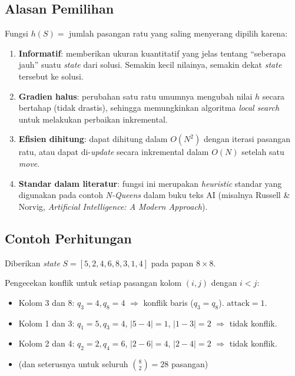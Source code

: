 \documentclass[12pt,a4paper]{article}
\begin{document}
\subsection{Alasan Pemilihan}
\label{subsec:alasan-objective}

Fungsi $h(S) = $ jumlah pasangan ratu yang saling menyerang dipilih karena:
\begin{enumerate}[label=\arabic*.]
    \item \textbf{Informatif}: memberikan ukuran kuantitatif yang jelas tentang ``seberapa jauh'' suatu \textit{state} dari solusi. Semakin kecil nilainya, semakin dekat \textit{state} tersebut ke solusi.
    \item \textbf{Gradien halus}: perubahan satu ratu umumnya mengubah nilai $h$ secara bertahap (tidak drastis), sehingga memungkinkan algoritma \textit{local search} untuk melakukan perbaikan inkremental.
    \item \textbf{Efisien dihitung}: dapat dihitung dalam $O(N^2)$ dengan iterasi pasangan ratu, atau dapat di-\textit{update} secara inkremental dalam $O(N)$ setelah satu \textit{move}.
    \item \textbf{Standar dalam literatur}: fungsi ini merupakan \textit{heuristic} standar yang digunakan pada contoh \textit{N-Queens} dalam buku teks AI (misalnya Russell \& Norvig, \textit{Artificial Intelligence: A Modern Approach}).
\end{enumerate}

\subsection{Contoh Perhitungan}
\label{subsec:contoh-hitung}

Diberikan \textit{state} $S = [5, 2, 4, 6, 8, 3, 1, 4]$ pada papan $8 \times 8$.

Pengecekan konflik untuk setiap pasangan kolom $(i, j)$ dengan $i < j$:
\begin{itemize}
    \item Kolom 3 dan 8: $q_3 = 4, q_8 = 4$ $\Rightarrow$ konflik baris ($q_3 = q_8$). $\text{attack} = 1$.
    \item Kolom 1 dan 3: $q_1 = 5, q_3 = 4$, $|5 - 4| = 1$, $|1 - 3| = 2$ $\Rightarrow$ tidak konflik.
    \item Kolom 2 dan 4: $q_2 = 2, q_4 = 6$, $|2 - 6| = 4$, $|2 - 4| = 2$ $\Rightarrow$ tidak konflik.
    \item (dan seterusnya untuk seluruh $\binom{8}{2} = 28$ pasangan)
\end{itemize}
\end{document}
